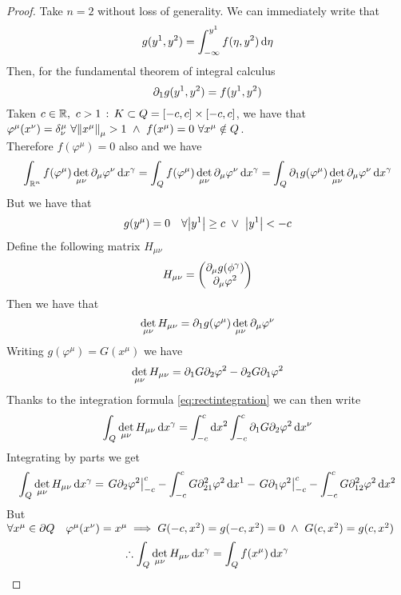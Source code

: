 \documentclass[../complete.tex]{subfiles}
\begin{document}
\begin{proof}
	Take $n=2$ without loss of generality. We can immediately write that
	\begin{equation*}
		g(y^1,y^2)=\int_{-\infty}^{y^1}f(\eta,y^2)\operatorname{d\!}\eta
	\end{equation*}
	Then, for the fundamental theorem of integral calculus
	\begin{equation*}
		\partial_1g(y^1,y^2)=f(y^1,y^2)
	\end{equation*}
	Taken $c\in\mathbb{R},\ c>1\, :\,  K\subset Q=[-c,c]\times[-c,c]$, we have that $\varphi^\mu(x^\nu)=\delta^\mu_\nu\ \forall\norm{x^\mu}_\mu>1\ \wedge\ f(x^\mu)=0\ \forall x^\mu\notin Q$.\\
	Therefore $f(\varphi^\mu)=0$ also and we have
	\begin{equation*}
		\int_{\mathbb{R}^n}^{}f(\varphi^\mu)\det_{\mu\nu}\partial_\mu\varphi^\nu\operatorname{d\!} x^\gamma=\int_{Q}^{}f(\varphi^\mu)\det_{\mu\nu}\partial_\mu\varphi^\nu\operatorname{d\!} x^\gamma=\int_{Q}^{}\partial_1g(\varphi^\mu)\det_{\mu\nu}\partial_\mu\varphi^\nu\operatorname{d\!} x^\gamma
	\end{equation*}
	But we have that
	\begin{equation*}
		g(y^\mu)=0\quad\forall\abs{y^1}\ge c\ \vee\ \abs{y^1}<-c
	\end{equation*}
	Define the following matrix $H_{\mu\nu}$
	\begin{equation*}
		H_{\mu\nu}=\begin{pmatrix}\partial_\mu g(\phi^\gamma)\\\partial_\mu\varphi^2\end{pmatrix}
	\end{equation*}
	Then we have that
	\begin{equation*}
		\det_{\mu\nu}H_{\mu\nu}=\partial_1g(\varphi^\mu)\det_{\mu\nu}\partial_{\mu}\varphi^\nu
	\end{equation*}
	Writing $g(\varphi^\mu)=G(x^\mu)$ we have
	\begin{equation*}
		\det_{\mu\nu}H_{\mu\nu}=\partial_1G\partial_2\varphi^2-\partial_2G\partial_1\varphi^2
	\end{equation*}
	Thanks to the integration formula \eqref{eq:rectintegration} we can then write
	\begin{equation*}
		\int_{Q}^{}\det_{\mu\nu}H_{\mu\nu}\operatorname{d\!} x^\gamma=\int_{-c}^{c}\operatorname{d\!} x^2\int_{-c}^{c}\partial_1G\partial_2\varphi^2\operatorname{d\!} x^\nu
	\end{equation*}
	Integrating by parts we get
	\begin{equation*}
		\int_{Q}^{}\det_{\mu\nu}H_{\mu\nu}\operatorname{d\!} x^\gamma=\left.G\partial_2\varphi^2\right|^c_{-c}-\int_{-c}^{c}G\partial_{21}^2\varphi^2\operatorname{d\!} x^1-\left.G\partial_1\varphi^2\right|^c_{-c}-\int_{-c}^{c}G\partial_{12}^2\varphi^2\operatorname{d\!} x^2
	\end{equation*}
	But $\forall x^\mu\in\del Q\quad\varphi^\mu(x^\nu)=x^\mu\implies G(-c,x^2)=g(-c,x^2)=0\ \wedge\ G(c,x^2)=g(c,x^2)$
	\begin{equation*}
		\therefore\int_{Q}^{}\det_{\mu\nu}H_{\mu\nu}\operatorname{d\!} x^\gamma=\int_{Q}^{}f(x^\mu)\operatorname{d\!} x^\gamma
	\end{equation*}
\end{proof}
\end{document}
